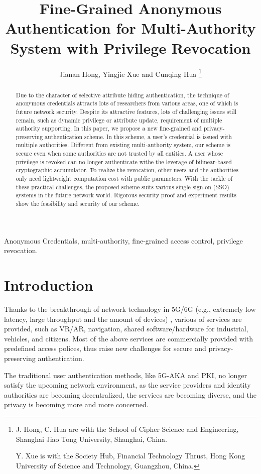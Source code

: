 \documentclass[journal]{IEEEtran}
\title{Fine-Grained Anonymous Authentication for Multi-Authority System with Privilege Revocation}
\author{Jianan Hong, Yingjie Xue and Cunqing Hua
\thanks{J. Hong, C. Hua are with the School of Cipher Science and Engineering, Shanghai Jiao Tong University, Shanghai, China.

Y. Xue is with the Society Hub, Financial Technology Thrust, Hong Kong University of Science and Technology, Guangzhou, China.
}
}
\begin{document}
	\maketitle
	
	\begin{abstract}
		Due to the character of selective attribute hiding authentication, the technique of anonymous credentials attracts lots of researchers from various areas, one of which is future network security. Despite its attractive features, lots of challenging issues still remain, such as dynamic privilege or attribute update, requirement of multiple authority supporting. 
		In this paper, we propose a new fine-grained and privacy-preserving authentication scheme. In this scheme, a user's credential is issued with multiple authorities. Different from existing multi-authority system, our scheme is secure even when some authorities are not trusted by all entities. A user whose privilege is revoked can no longer authenticate withe the leverage of bilinear-based cryptographic accumulator. To realize the revocation, other users and the authorities only need lightweight computation cost with public parameters. With the tackle of these practical challenges, the proposed scheme suits various single sign-on (SSO) systems in the future network world. Rigorous security proof and experiment results show the feasibility and security of our scheme.
	\end{abstract}
\begin{IEEEkeywords}
	Anonymous Credentials, multi-authority, fine-grained access control, privilege revocation.
\end{IEEEkeywords}


\section{Introduction}
Thanks to the breakthrough of network technology in 5G/6G (e.g., extremely low latency, large throughput and the amount of devices) \cite{siriwardhana2021survey, jiang2021road}, various of services are provided, such as VR/AR, navigation, shared software/hardware for industrial, vehicles, and citizens. Most of the above services are commercially provided with predefined access polices, thus raise new challenges for secure and privacy-preserving authentication. 

The traditional user authentication methods, like 5G-AKA and PKI, no longer satisfy the upcoming network environment, as the service providers and identity authorities are becoming decentralized, the services are becoming diverse, and the privacy is becoming more and more concerned. 
\end{document}
